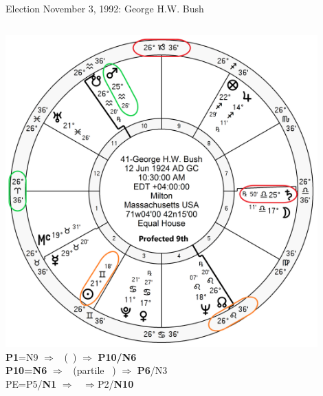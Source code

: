 \begin{frame}[t]{Election November 3, 1992: George H.W. Bush}
\begin{columns}[T, onlytextwidth]
\vspace{-1em}
{\includegraphics[width=0.9\textwidth]{charts/GHW-Bush-Prof-9th.png}}
\fontsize{8pt}{9pt}\selectfont
\textbf{\dgreen P1}=N9
	$\Rightarrow$ \Mars\, (\Conjunction\, \SouthNode) 
	$\Rightarrow$ \textbf{\red P10/N6}\\
\textbf{\red P10=N6}
	$\Rightarrow$ \Saturn\, (partile \Trine\, \Mars) $\Rightarrow$ \textbf{\red P6}/N3\\
PE=P5/\textbf{\dgreen N1}
	 $\Rightarrow$ \Sun\, $\Rightarrow$P2/\textbf{\red N10}

\end{columns}
\end{frame}
